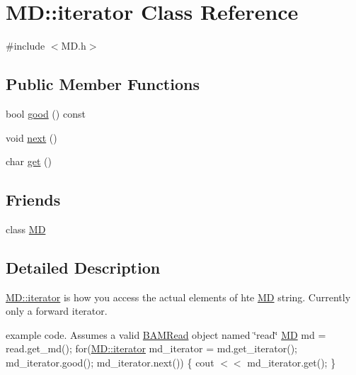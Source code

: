 \hypertarget{class_m_d_1_1iterator}{
\section{MD::iterator Class Reference}
\label{class_m_d_1_1iterator}
}


{\ttfamily \#include $<$MD.h$>$}

\subsection*{Public Member Functions}
\begin{DoxyCompactItemize}
\item 
bool \hyperlink{class_m_d_1_1iterator_af7c76fd41e89596ca1316240450556ad}{good} () const 
\item 
void \hyperlink{class_m_d_1_1iterator_a235c960eb3aeea90190ce31150ee2b91}{next} ()
\item 
char \hyperlink{class_m_d_1_1iterator_a5fa1e01668a60a5c59555ecfec9f58d6}{get} ()
\end{DoxyCompactItemize}
\subsection*{Friends}
\begin{DoxyCompactItemize}
\item 
\hypertarget{class_m_d_1_1iterator_ad2a05478d344fd87e28cba84fcef1740}{
class \hyperlink{class_m_d_1_1iterator_ad2a05478d344fd87e28cba84fcef1740}{MD}}
\label{class_m_d_1_1iterator_ad2a05478d344fd87e28cba84fcef1740}

\end{DoxyCompactItemize}


\subsection{Detailed Description}
\hyperlink{class_m_d_1_1iterator}{MD::iterator} is how you access the actual elements of hte \hyperlink{class_m_d}{MD} string. Currently only a forward iterator.

example code. Assumes a valid \hyperlink{class_b_a_m_read}{BAMRead} object named \char`\"{}read\char`\"{} \hyperlink{class_m_d}{MD} md = read.get\_\-md(); for(\hyperlink{class_m_d_1_1iterator}{MD::iterator} md\_\-iterator = md.get\_\-iterator(); md\_\-iterator.good(); md\_\-iterator.next()) \{ cout $<$$<$ md\_\-iterator.get(); \} 

